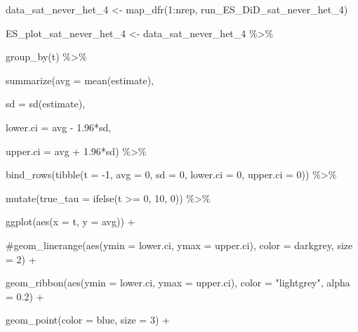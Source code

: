 \documentclass[
  letterpaper,
  DIV=11,
  numbers=noendperiod]{scrartcl}
\newenvironment{Shaded}{\begin{snugshade}}{\end{snugshade}}
\newcommand{\AttributeTok}[1]{\textcolor[rgb]{0.40,0.45,0.13}{#1}}
\newcommand{\CommentTok}[1]{\textcolor[rgb]{0.37,0.37,0.37}{#1}}
\newcommand{\DecValTok}[1]{\textcolor[rgb]{0.68,0.00,0.00}{#1}}
\newcommand{\FloatTok}[1]{\textcolor[rgb]{0.68,0.00,0.00}{#1}}
\newcommand{\FunctionTok}[1]{\textcolor[rgb]{0.28,0.35,0.67}{#1}}
\newcommand{\NormalTok}[1]{\textcolor[rgb]{0.00,0.23,0.31}{#1}}
\newcommand{\OtherTok}[1]{\textcolor[rgb]{0.00,0.23,0.31}{#1}}
\newcommand{\SpecialCharTok}[1]{\textcolor[rgb]{0.37,0.37,0.37}{#1}}
\newcommand{\StringTok}[1]{\textcolor[rgb]{0.13,0.47,0.30}{#1}}
\begin{document}
\begin{Shaded}
\begin{Highlighting}[]
\NormalTok{data\_sat\_never\_het\_4 }\OtherTok{\textless{}{-}} \FunctionTok{map\_dfr}\NormalTok{(}\DecValTok{1}\SpecialCharTok{:}\NormalTok{nrep, run\_ES\_DiD\_sat\_never\_het\_4)}

 

\NormalTok{ES\_plot\_sat\_never\_het\_4 }\OtherTok{\textless{}{-}}\NormalTok{ data\_sat\_never\_het\_4 }\SpecialCharTok{\%\textgreater{}\%}

  \FunctionTok{group\_by}\NormalTok{(t) }\SpecialCharTok{\%\textgreater{}\%}

  \FunctionTok{summarize}\NormalTok{(}\AttributeTok{avg =} \FunctionTok{mean}\NormalTok{(estimate),}

            \AttributeTok{sd =} \FunctionTok{sd}\NormalTok{(estimate),}

            \AttributeTok{lower.ci =}\NormalTok{ avg }\SpecialCharTok{{-}} \FloatTok{1.96}\SpecialCharTok{*}\NormalTok{sd,}

            \AttributeTok{upper.ci =}\NormalTok{ avg }\SpecialCharTok{+} \FloatTok{1.96}\SpecialCharTok{*}\NormalTok{sd) }\SpecialCharTok{\%\textgreater{}\%}

  \FunctionTok{bind\_rows}\NormalTok{(}\FunctionTok{tibble}\NormalTok{(}\AttributeTok{t =} \SpecialCharTok{{-}}\DecValTok{1}\NormalTok{, }\AttributeTok{avg =} \DecValTok{0}\NormalTok{, }\AttributeTok{sd =} \DecValTok{0}\NormalTok{, }\AttributeTok{lower.ci =} \DecValTok{0}\NormalTok{, }\AttributeTok{upper.ci =} \DecValTok{0}\NormalTok{)) }\SpecialCharTok{\%\textgreater{}\%}

  \FunctionTok{mutate}\NormalTok{(}\AttributeTok{true\_tau =} \FunctionTok{ifelse}\NormalTok{(t }\SpecialCharTok{\textgreater{}=} \DecValTok{0}\NormalTok{, }\DecValTok{10}\NormalTok{, }\DecValTok{0}\NormalTok{)) }\SpecialCharTok{\%\textgreater{}\%}

  \FunctionTok{ggplot}\NormalTok{(}\FunctionTok{aes}\NormalTok{(}\AttributeTok{x =}\NormalTok{ t, }\AttributeTok{y =}\NormalTok{ avg)) }\SpecialCharTok{+}

  \CommentTok{\#geom\_linerange(aes(ymin = lower.ci, ymax = upper.ci), color = \textquotesingle{}darkgrey\textquotesingle{}, size = 2) +}

  \FunctionTok{geom\_ribbon}\NormalTok{(}\FunctionTok{aes}\NormalTok{(}\AttributeTok{ymin =}\NormalTok{ lower.ci, }\AttributeTok{ymax =}\NormalTok{ upper.ci), }\AttributeTok{color =} \StringTok{"lightgrey"}\NormalTok{, }\AttributeTok{alpha =} \FloatTok{0.2}\NormalTok{) }\SpecialCharTok{+}

  \FunctionTok{geom\_point}\NormalTok{(}\AttributeTok{color =} \StringTok{\textquotesingle{}blue\textquotesingle{}}\NormalTok{, }\AttributeTok{size =} \DecValTok{3}\NormalTok{) }\SpecialCharTok{+}


\end{Highlighting}
\end{Shaded}
\end{document}
